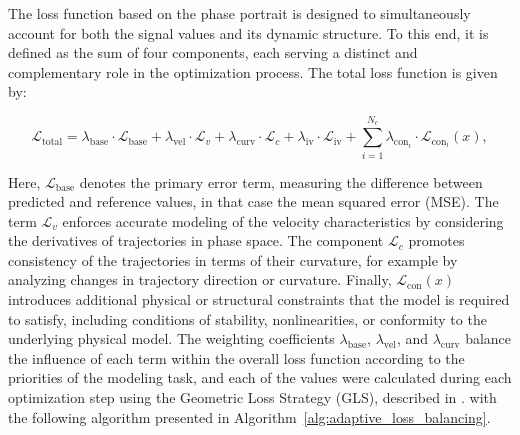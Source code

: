 \documentclass[11pt, oneside]{article}
\begin{document}
The loss function based on the phase portrait is designed to simultaneously account for both the  signal values and its dynamic structure. To this end, it is defined as the sum of four components, each serving a distinct and complementary role in the optimization process. The total loss function is given by:

\begin{equation}
    \mathcal{L}_{\mathrm{total}} = \lambda_{\mathrm{base}} \cdot \mathcal{L}_{\mathrm{base}} + \lambda_{\mathrm{vel}} \cdot \mathcal{L}_{v} + \lambda_{\mathrm{curv}} \cdot \mathcal{L}_{c} + \lambda_{\mathrm{iv}} \cdot \mathcal{L}_{\mathrm{iv}} +\sum^{N_c}_{i=1} \lambda_{\mathrm{con}_i} \cdot \mathcal{L}_{\mathrm{con}_i}(x),
    \label{eq:loss_function}
\end{equation}

Here, $\mathcal{L}_{\mathrm{base}}$ denotes the primary error term,  measuring the difference between predicted and reference values, in that case the mean squared error (MSE). The term $\mathcal{L}_{v}$ enforces accurate modeling of the velocity characteristics by considering the derivatives of trajectories in phase space. The component $\mathcal{L}_{c}$ promotes consistency of the trajectories in terms of their curvature, for example by analyzing changes in trajectory direction or curvature. Finally, $\mathcal{L}_{\mathrm{con}}(x)$ introduces additional physical or structural constraints that the model is required to satisfy, including conditions of stability, nonlinearities, or conformity to the underlying physical model. The weighting coefficients $\lambda_{\mathrm{base}}$, $\lambda_{\mathrm{vel}}$,  and $\lambda_{\mathrm{curv}}$ balance the influence of each term within the overall loss function according to the priorities of the modeling task, and each of the values were calculated during each optimization step using the Geometric Loss Strategy (GLS), described in \cite{Cipolla2018, Chen2018}. with the following algorithm presented in Algorithm~\ref{alg:adaptive_loss_balancing}.
\end{document}
